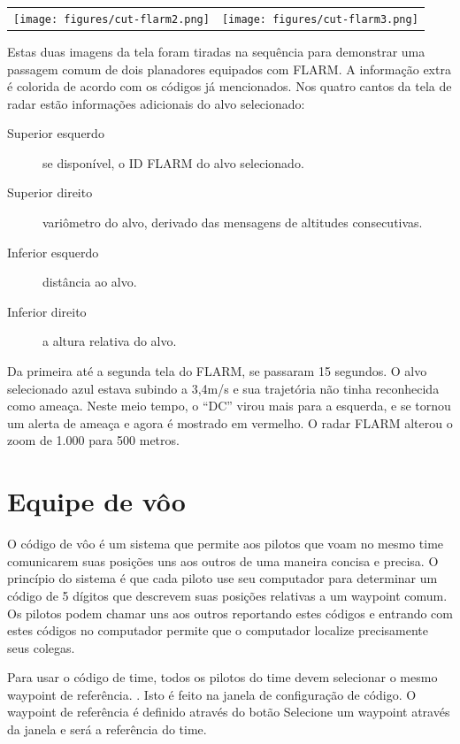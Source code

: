 \begin{center}
\begin{tabular}{c c}
\texttt{[image: figures/cut-flarm2.png]}&
\texttt{[image: figures/cut-flarm3.png]}\\
\end{tabular}
\end{center}
Estas duas imagens da tela foram tiradas na sequência para demonstrar uma passagem comum de dois planadores equipados com FLARM.  A informação extra é colorida de acordo com os códigos já mencionados.  Nos quatro cantos da tela de radar estão informações adicionais do alvo selecionado:

\begin{description}
\item[Superior esquerdo]  se disponível, o ID FLARM do alvo selecionado.
\item[Superior direito]  variômetro do alvo, derivado das mensagens de altitudes consecutivas.
\item[Inferior esquerdo]  distância ao alvo.
\item[Inferior direito]  a altura relativa do alvo.
\end{description}

Da primeira até a segunda tela do FLARM, se passaram 15 segundos.  O alvo selecionado azul estava subindo a 3,4m/s e sua trajetória não tinha reconhecida como ameaça.  Neste meio tempo, o “DC” virou mais para a esquerda, e se tornou um alerta de ameaça e agora é mostrado em vermelho.  O radar FLARM alterou o zoom de 1.000 para 500 metros.  

\section{Equipe de vôo}\label{sec:team-flying}

O código de vôo é um sistema que permite aos pilotos que voam no mesmo time comunicarem suas posições uns aos outros de uma maneira concisa e precisa.  O princípio do sistema é que cada piloto use seu computador para determinar um código de 5 dígitos que descrevem suas posições relativas a um waypoint comum.  Os pilotos podem chamar uns aos outros reportando estes códigos e entrando com estes códigos no computador permite que o computador localize precisamente seus colegas.

Para usar o código de time, todos os pilotos do time devem selecionar o mesmo waypoint de referência. .  Isto é feito na janela de configuração de código. 
O waypoint de referência é definido através do botão    Selecione um waypoint através da janela e será a referência do time.


